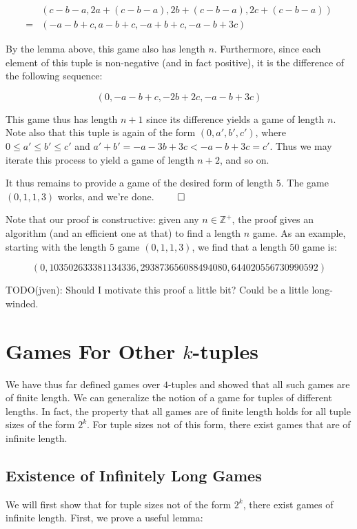 \documentclass[12pt]{amsart}
\newcommand{\zp}{\mathbb{Z}^+}
\begin{document}
$$\begin{array}{cl}
& (c - b - a, 2a + (c - b - a), 2b + (c - b - a), 2c + (c - b - a)) \\
= & (-a - b + c, a - b + c, -a + b + c, -a - b + 3c)
\end{array}$$

By the lemma above, this game also has length $n$. Furthermore, since each element of this tuple is non-negative (and in fact positive), it is the difference of the following sequence:

$$(0, -a - b + c, -2b + 2c, -a - b + 3c)$$

This game thus has length $n + 1$ since its difference yields a game of length $n$. Note also that this tuple is again of the form $(0, a', b', c')$, where $0\leq a'\leq b'\leq c'$ and $a' + b' = -a - 3b + 3c < -a - b + 3c = c'$. Thus we may iterate this process to yield a game of length $n + 2$, and so on.

It thus remains to provide a game of the desired form of length $5$. The game $(0, 1, 1, 3)$ works, and we're done. $\qed$

Note that our proof is constructive: given any $n\in \zp$, the proof gives an algorithm (and an efficient one at that) to find a length $n$ game. As an example, starting with the length $5$ game $(0, 1, 1, 3)$, we find that a length $50$ game is:

$$(0, 103502633381134336, 293873656088494080, 644020556730990592)$$

TODO(jven): Should I motivate this proof a little bit? Could be a little long-winded.

\section{Games For Other $k$-tuples}

We have thus far defined games over $4$-tuples and showed that all such games are of finite length. We can generalize the notion of a game for tuples of different lengths. In fact, the property that all games are of finite length holds for all tuple sizes of the form $2^k$. For tuple sizes not of this form, there exist games that are of infinite length.

\subsection{Existence of Infinitely Long Games}

We will first show that for tuple sizes not of the form $2^k$, there exist games of infinite length. First, we prove a useful lemma:
\end{document}
